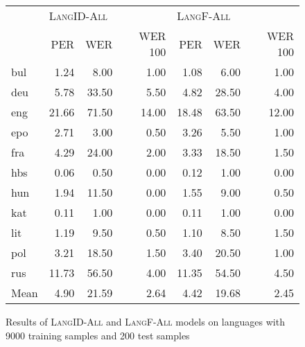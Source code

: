 
\begin{figure}
\centering
\begin{tabular}{lrrrrrr}
\toprule
{} & \multicolumn{3}{l}{\textsc{LangID-All}} & \multicolumn{3}{l}{\textsc{LangF-All}} \\
{} &        PER & WER & WER 100 &       PER & WER & WER 100 \\
\midrule
bul  &       1.24 &  8.00 &    1.00 &      1.08 &  6.00 &    1.00 \\
deu  &       5.78 & 33.50 &    5.50 &      4.82 & 28.50 &    4.00 \\
eng  &      21.66 & 71.50 &   14.00 &     18.48 & 63.50 &   12.00 \\
epo  &       2.71 &  3.00 &    0.50 &      3.26 &  5.50 &    1.00 \\
fra  &       4.29 & 24.00 &    2.00 &      3.33 & 18.50 &    1.50 \\
hbs  &       0.06 &  0.50 &    0.00 &      0.12 &  1.00 &    0.00 \\
hun  &       1.94 & 11.50 &    0.00 &      1.55 &  9.00 &    0.50 \\
kat  &       0.11 &  1.00 &    0.00 &      0.11 &  1.00 &    0.00 \\
lit  &       1.19 &  9.50 &    0.50 &      1.10 &  8.50 &    1.50 \\
pol  &       3.21 & 18.50 &    1.50 &      3.40 & 20.50 &    1.00 \\
rus  &      11.73 & 56.50 &    4.00 &     11.35 & 54.50 &    4.50 \\
\midrule
Mean &       4.90 & 21.59 &    2.64 &      4.42 & 19.68 &    2.45 \\
\bottomrule
\end{tabular}
\caption{Results of \textsc{LangID-All} and \textsc{LangF-All} models on languages with 9000 training samples and 200 test samples}
\label{figure:big-lang-results}
\end{figure}

